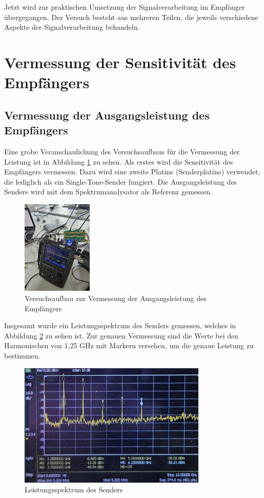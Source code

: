 Jetzt wird zur praktischen Umsetzung der Signalverarbeitung im Empfänger übergegangen. Der Versuch besteht aus mehreren Teilen, die jeweils verschiedene Aspekte der Signalverarbeitung behandeln.

\section{Vermessung der Sensitivität des Empfängers} %
\subsection{Vermessung der Ausgangsleistung des Empfängers}
Eine grobe Veranschaulichung des Versuchsaufbaus für die Vermessung der Leistung ist in Abbildung \ref{fig:versuchsaufbau} zu sehen. 
Als erstes wird die Sensitivität des Empfängers vermessen. Dazu wird eine zweite Platine (Senderplatine) verwendet, die lediglich als ein Single-Tone-Sender fungiert. Die Ausgangsleistung des Senders wird mit dem Spektrumanalysator als Referenz gemessen. 
\begin{figure}[H]
    \centering
    \includegraphics[width=0.3\textwidth]{Pictures/VersuchsaufbauLeistung.jpg}
    \caption{Versuchsaufbau zur Vermessung der Ausgangsleistung des Empfängers}
    \label{fig:versuchsaufbau}
\end{figure}

Insgesamt wurde ein Leistungsspektrum des Senders gemessen, welches in Abbildung \ref{fig:sender} zu sehen ist. Zur genauen Vermessung sind die Werte bei den Harmonischen von 1,25 GHz mit Markern versehen, um die genaue Leistung zu bestimmen.

\begin{figure}[H]
    \centering
    \includegraphics[width=0.8\textwidth]{Pictures/Sender.jpg}
    \caption{Leistungsspektrum des Senders}
    \label{fig:sender}
\end{figure}

